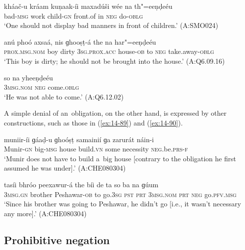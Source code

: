 \begin{exe}
\ex
\label{ex:14-86}
\gll kháač-u kráam kuṇaak-íi maxadúši wée na  th"=eeṇḍeéu \\
bad-\textsc{msg} work child-\textsc{gn} front.of in \textsc{neg} do-\textsc{oblg } \\
\glt `One should not display bad manners in front of children.' (A:SMO024)

\ex
\label{ex:14-87}
\gll anú phoó axsaá, nis ɡhooṣṭ-á  the na har"=eeṇḍeéu \\
\textsc{prox.msg.nom} boy dirty \textsc{3sg.prox.acc} house-\textsc{ob}  to \textsc{neg} take.away-\textsc{oblg }\\
\glt `This boy is dirty; he should not be brought into the house.' (A:Q6.09.16)

\ex
\label{ex:14-88}
\gll so na yheeṇḍeéu \\
\textsc{3msg}.\textsc{nom} \textsc{neg} come.\textsc{oblg}  \\
\glt `He was not able to come.' (A:Q6.12.02)
\end{exe}

A simple denial of an~obligation, on the other hand, is expressed by other constructions, such as those in (\ref{ex:14-89}) and (\ref{ex:14-90}).

\begin{exe}
\ex
\label{ex:14-89}
\gll muniir-íi ɡáaḍ-u ɡhoóṣṭ samainií ɡa zarurát  náin-i \\
Munir-\textsc{gn} big-\textsc{msg} house build.\textsc{vn} some necessity  \textsc{neg.}be.\textsc{prs}-\textsc{f } \\
\glt `Munir does not have to build a~big house [contrary to the obligation he first assumed he was under].' (A:CHE080304)

\ex
\label{ex:14-90}
\gll tasíi bhróo peexawur-á the bíi de ta  so ba na ɡúum \\
\textsc{3msg}.\textsc{gn} brother Peshawar-\textsc{ob} to go.\textsc{3sg} \textsc{pst} \textsc{prt}  \textsc{3msg.nom} \textsc{prt} \textsc{neg} go.\textsc{pfv.msg } \\
\glt `Since his brother was going to Peshawar, he didn't go [i.e., it wasn't necessary any more].' (A:CHE080304)
\end{exe}

\subsection{Prohibitive negation}
\label{subsec:14-3-5}


